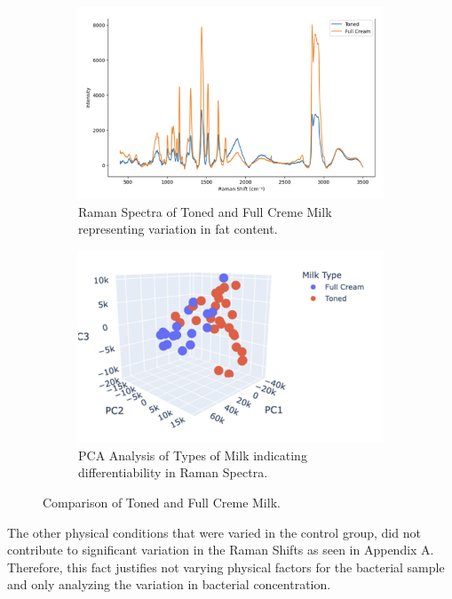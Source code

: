 \begin{figure}[htbp]
  \centering
  \begin{subfigure}[b]{0.45\textwidth}
    \centering
    \includegraphics[scale=0.5]{Figures/TonedFC.png}
    \caption{Raman Spectra of Toned and Full Creme Milk representing variation in fat content.}
    \label{fig: tonedfc}
  \end{subfigure}
  \hfill
  \begin{subfigure}[b]{0.45\textwidth}
    \centering
    \includegraphics[scale=0.5]{Figures/PCA_tonedFC.png}
    \caption{PCA Analysis of Types of Milk indicating differentiability in Raman Spectra.}
    \label{fig:pcatonedfc}
  \end{subfigure}
  \caption{Comparison of  Toned and Full Creme Milk.}
  \label{fig:combined2}
\end{figure}

\noindent The other physical conditions that were varied in the control group, did not contribute to significant variation in the Raman Shifts as seen in Appendix A. Therefore, this fact justifies not varying physical factors for the bacterial sample and only analyzing the variation in bacterial concentration. \\


